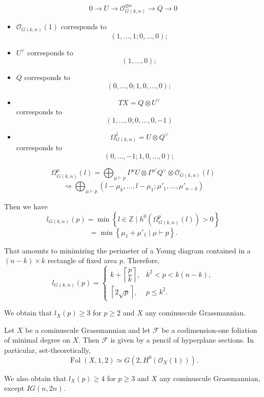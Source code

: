 $$
0\longrightarrow U
\longrightarrow
\mathcal{O}_{G(k,n)}^{\oplus n}
\longrightarrow Q
\longrightarrow 0
$$

\begin{itemize}
\item $\mathcal{O}_{G(k,n)}(1)$
corresponds to
$$
(1,\ldots,1;0,\ldots,0);
$$

\item $U^\vee$ corresponds to
$$
(1,\ldots,0);
$$

\item $Q$ corresponds to
$$
(0,\ldots,0;1,0,\ldots,0);
$$

\item
$$
TX=Q\otimes U^\vee
$$
corresponds to
$$
(1,\ldots,0;0,\ldots,0,-1)
$$

\item
$$
\Omega^1_{G(k,n)}=U\otimes Q^\vee
$$
corresponds to
$$
(0,\ldots,-1;1,0,\ldots,0);
$$
\end{itemize}

$$
\Omega^p_{G(k,n)}(l)
=
\bigoplus_{\mu\vdash p}
\Gamma^\mu U\otimes
\Gamma^{\mu'}Q^\vee\otimes
\mathcal{O}_{G(k,n)}(l)
$$
$$
\rightsquigarrow
\bigoplus_{\mu\vdash p}
(l-\mu_k,\ldots,l-\mu_1;
\mu'_1,\ldots,\mu'_{n-k})
$$

Then we have
$$
l_{G(k,n)}(p)
=
\min\left\{
l\in\mathbb{Z}
\mid
h^0(\Omega^p_{G(k,n)}(l))>0
\right\}
$$
$$
=
\min\left\{
\mu_1+\mu'_1
\mid
\mu\vdash p
\right\}.
$$

That amounts to minimizing the perimeter
of a Young diagram contained in a
$(n-k)\times k$ rectangle of fixed area
$p$.
Therefore,
$$
l_{G(k,n)}(p)
=
\begin{cases}
k+\left\lceil\dfrac{p}{k}\right\rceil,
&
k^2<p<k(n-k),
\\[6pt]
\left\lceil2\sqrt{p}\right\rceil,
&
p\leq k^2.
\end{cases}
$$

We obtain that $l_X(p)\geq 3$ for
$p\geq 2$ and $X$ any cominuscule
Grassmannian.

\begin{theorem}
Let $X$ be a cominuscule Grassmannian and
let $\mathcal{F}$ be a codimension-one
foliation of minimal degree on $X$.
Then $\mathcal{F}$ is given by a pencil
of hyperplane sections.
In particular, set-theoretically,
$$
\operatorname{Fol}(X,1,2)
\simeq
G(2,H^0(\mathcal{O}_X(1))).
$$
\end{theorem}

We also obtain that $l_X(p)\geq 4$ for
$p\geq 3$ and $X$ any cominuscule
Grassmannian, except $IG(n,2n)$.

